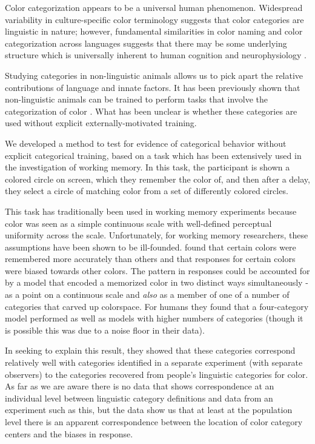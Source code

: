 Color categorization appears to be a universal human phenomenon. 
Widespread variability in culture-specific color terminology suggests that color categories are linguistic in nature; however, fundamental similarities in color naming and color categorization across languages suggests that there may be some underlying structure which is universally inherent to human cognition and neurophysiology \citep{berlin_basic_1991,gibson_color_2017}. 

Studying categories in non-linguistic animals allows us to pick apart the relative contributions of language and innate factors. It has been previously shown that non-linguistic animals can be trained to perform tasks that involve the categorization of color \citep{sandell_color_1979,fagot_cross-species_2006}. What has been unclear is whether these categories are used without explicit externally-motivated training.


We developed a method to test for evidence of categorical behavior without explicit categorical training, based on a task which has been extensively used in the investigation of working memory. %
In this task, the participant is shown a colored circle on screen, which they remember the color of, and then after a delay, they select a circle of matching color from a set of differently colored circles.

This task has traditionally been used in working memory experiments because color was seen as a simple continuous scale with well-defined perceptual uniformity across the scale. 
Unfortunately, for working memory researchers, these assumptions have been shown to be ill-founded.
\cite{bae_why_2015} found that certain colors were remembered more accurately than others and that responses for certain colors were biased towards other colors.
The pattern in responses could be accounted for by a model that encoded a memorized color in two distinct ways simultaneously - as a point on a continuous scale and \emph{also} as a member of one of a number of categories that carved up colorspace. 
For humans they found that a four-category model performed as well as models with higher numbers of categories (though it is possible this was due to a noise floor in their data).

In seeking to explain this result, they showed that these categories correspond relatively well with categories identified in a separate experiment (with separate observers) to the categories recovered from people's linguistic categories for color. 
As far as we are aware there is no data that shows correspondence at an individual level between linguistic category definitions and data from an experiment such as this, but the \cite{bae_why_2015} data show us that at least at the population level there is an apparent correspondence between the location of color category centers and the biases in response.

